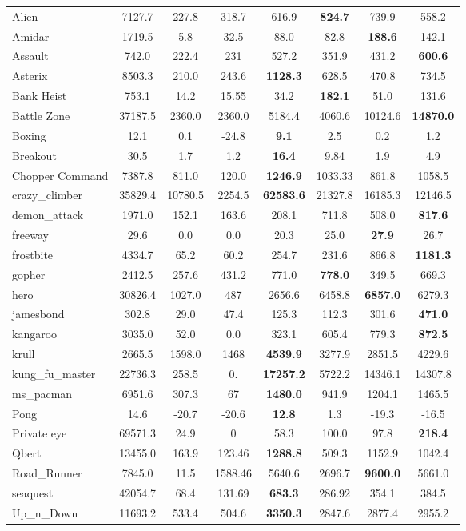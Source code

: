 \begin{table}[h!]
\begin{center}
\begin{small}
\begin{sc}
\begin{tabular}{lccccccc}
Alien & 7127.7 & 227.8 & 318.7  & 616.9 & {\bf 824.7} & 739.9 & 558.2 \\
Amidar & 1719.5 & 5.8 & 32.5 & 88.0 & 82.8 & {\bf 188.6}  & 142.1  \\
Assault & 742.0 & 222.4 & 231 &  527.2 & 351.9 & 431.2 & {\bf 600.6} \\
Asterix & 8503.3 & 210.0 & 243.6 & {\textbf{1128.3}} & 628.5 & 470.8 & 734.5 \\
Bank Heist & 753.1 & 14.2 & 15.55 & 34.2 & {\bf 182.1} & 51.0 & 131.6 \\
Battle Zone & 37187.5 & 2360.0 & 2360.0 & 5184.4 & 4060.6 & 10124.6 & {\bf 14870.0} \\
Boxing & 12.1 & 0.1 & -24.8 & {\textbf{9.1}} & 2.5 & 0.2 & 1.2 \\
Breakout & 30.5 & 1.7 & 1.2 & {\bf 16.4} & 9.84 & 1.9 & 4.9 \\
Chopper Command & 7387.8 & 811.0 & 120.0 & {\textbf{1246.9}} & 1033.33 & 861.8 & 1058.5 \\
crazy\_climber & 35829.4 & 10780.5 & 2254.5 & {\textbf{62583.6}} & 21327.8 & 16185.3 & 12146.5 \\
demon\_attack & 1971.0 & 152.1 & 163.6 & 208.1 & 711.8 & 508.0 & {\bf 817.6} \\
freeway & 29.6 & 0.0 & 0.0 & 20.3 & 25.0 & {\textbf{27.9}} & 26.7 \\
frostbite & 4334.7 & 65.2 & 60.2 & 254.7 & 231.6 & 866.8 & {\bf 1181.3} \\
gopher & 2412.5 & 257.6 & 431.2 & 771.0 & {\bf 778.0} & 349.5  & 669.3 \\
hero & 30826.4 & 1027.0 & 487 & 2656.6 & 6458.8 & {\textbf{6857.0}} & 6279.3 \\
jamesbond & 302.8 & 29.0 & 47.4 & 125.3 & 112.3 & 301.6 & {\bf 471.0} \\
kangaroo & 3035.0 & 52.0 & 0.0 & 323.1 & 605.4 & 779.3 & {\bf 872.5} \\
krull & 2665.5 & 1598.0 & 1468 & {\textbf{4539.9}} & 3277.9 & 2851.5 & 4229.6 \\
kung\_fu\_master & 22736.3 & 258.5  & 0. & {\textbf{17257.2}} & 5722.2 & 14346.1 & 14307.8 \\
ms\_pacman & 6951.6  & 307.3 & 67 & {\bf 1480.0} & 941.9 & 1204.1 & 1465.5 \\
Pong & 14.6   & -20.7 & -20.6 & {\textbf{12.8}} & 1.3 & -19.3 & -16.5 \\
Private eye & 69571.3 & 24.9 & 0 & 58.3 & 100.0 & 97.8 & {\bf 218.4} \\
Qbert & 13455.0 & 163.9 & 123.46 & {\textbf{1288.8}} & 509.3 & 1152.9 & 1042.4 \\
Road\_Runner & 7845.0 & 11.5 & 1588.46 & 5640.6 & 2696.7 & {\textbf{9600.0}} & 5661.0 \\
seaquest & 42054.7 & 68.4 & 131.69 & {\textbf{683.3}}  & 286.92 & 354.1 & 384.5 \\
Up\_n\_Down & 11693.2 & 533.4 & 504.6 & {\textbf{3350.3}} & 2847.6 & 2877.4  &  2955.2 \\


\end{tabular}
\end{sc}
\end{small}
\end{center}
\end{table}
